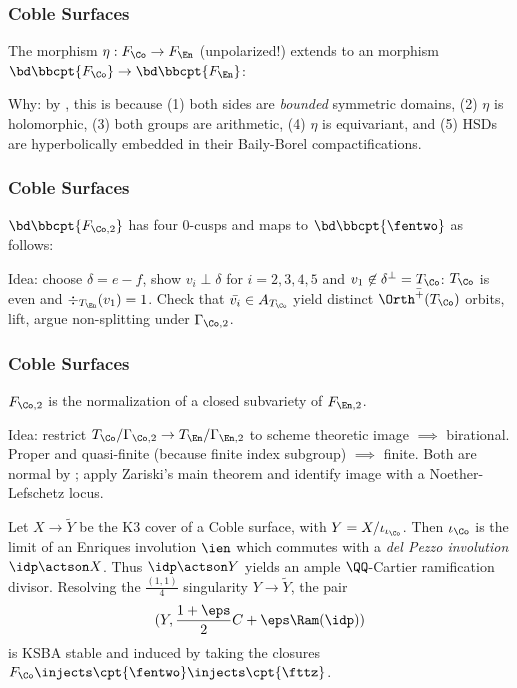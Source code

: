 \documentclass{beamer}
\begin{document}
{\begin{frame}
\end{frame}
\begin{frame}\frametitle{Coble Surfaces}
\begin{theorem}\label{thm:cusp_correspondence}
The morphism $\eta: F_\Co\to F_\En$ (unpolarized!) extends to an morphism $\bd \bbcpt{F_{\Co}} \to \bd \bbcpt{F_{\En}}$:


\end{theorem}
{\tiny
Why: by \cite{KK72}, this is because (1) both sides are \textit{bounded} symmetric domains, (2) $\eta$ is holomorphic, (3) both groups are arithmetic, (4) $\eta$ is equivariant, and (5) HSDs are hyperbolically embedded in their Baily-Borel compactifications.
}
\end{frame}
\begin{frame}\frametitle{Coble Surfaces}
{\small
\begin{conjecture}
$\bd\bbcpt{F_{\Co, 2}}$ has four 0-cusps and maps to $\bd\bbcpt{\fentwo}$ as follows:
\end{conjecture}
\tiny
Idea: choose $\delta = e-f$, show $v_i \perp \delta$ for $i=2,3,4,5$ \cite{Ste91} and $v_1\not\in\delta^{\perp} = T_{\Co}$: $T_{\Co}$ is even and $\div_{T_\En}(v_1) = 1$.
Check that $\bar{v_i} \in A_{T_{\Co}}$ yield distinct $\bar{\Orth^+(T_\Co)}$ orbits, lift, argue non-splitting under $\Gamma_{\Co, 2}$.
}
\end{frame}
\begin{frame}\frametitle{Coble Surfaces}
\begin{theorem}
$F_{\Co, 2}$ is the normalization of a closed subvariety of $F_{\En, 2}$.
\end{theorem}
{\small
Idea: restrict $T_{\Co}/\Gamma_{\Co, 2} \to T_{\En}/\Gamma_{\En, 2}$ to scheme theoretic image $\implies$ birational. Proper and quasi-finite (because finite index subgroup) $\implies$ finite. Both are normal by \cite{BB66}; apply Zariski's main theorem and identify image with a Noether-Lefschetz locus.
}
\begin{conjecture}
{\small
Let $X\to \tilde Y$ be the K3 cover of a Coble surface, with $Y = X/\iota_{\iota_{\Co}}$. Then $\iota_{\Co}$ is the limit of an Enriques involution $\ien$ which commutes with a \textit{del Pezzo involution} $\idp\actson X$. Thus $\idp\actson Y$ yields an ample $\QQ$-Cartier ramification divisor. Resolving the $\frac{ (1,1)}{ 4}$ singularity $Y\to \tilde Y$, the pair \[ (Y, \frac{1 + \eps}{2} C + \eps \Ram(\idp)) \] 
is KSBA stable and induced by taking the closures $F_{\Co} \injects \cpt{\fentwo} \injects \cpt{\fttz}$.
}
\end{conjecture}
\end{frame}

}
\end{document}
